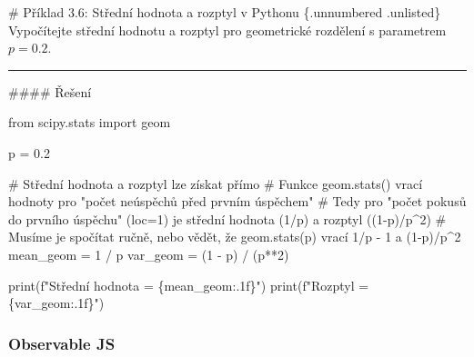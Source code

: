 \documentclass[
  czech,
  11pt,
  letterpaper,
  DIV=11,
  numbers=noendperiod]{scrreprt}
\newenvironment{Shaded}{\begin{snugshade}}{\end{snugshade}}
\newcommand{\BuiltInTok}[1]{\textcolor[rgb]{0.00,0.23,0.31}{#1}}
\newcommand{\CommentTok}[1]{\textcolor[rgb]{0.37,0.37,0.37}{#1}}
\newcommand{\DecValTok}[1]{\textcolor[rgb]{0.68,0.00,0.00}{#1}}
\newcommand{\FloatTok}[1]{\textcolor[rgb]{0.68,0.00,0.00}{#1}}
\newcommand{\ImportTok}[1]{\textcolor[rgb]{0.00,0.46,0.62}{#1}}
\newcommand{\NormalTok}[1]{\textcolor[rgb]{0.00,0.23,0.31}{#1}}
\newcommand{\OperatorTok}[1]{\textcolor[rgb]{0.37,0.37,0.37}{#1}}
\newcommand{\SpecialCharTok}[1]{\textcolor[rgb]{0.37,0.37,0.37}{#1}}
\newcommand{\SpecialStringTok}[1]{\textcolor[rgb]{0.13,0.47,0.30}{#1}}
\begin{document}
\begin{tcolorbox}[enhanced jigsaw, arc=.35mm, bottomrule=.15mm, bottomtitle=1mm, breakable, colback=white, colbacktitle=quarto-callout-note-color!10!white, colframe=quarto-callout-note-color-frame, coltitle=black, left=2mm, leftrule=.75mm, opacityback=0, opacitybacktitle=0.6, rightrule=.15mm, title=\textcolor{quarto-callout-note-color}{\faInfo}\hspace{0.5em}{Poznámka}, titlerule=0mm, toprule=.15mm, toptitle=1mm]

\# Příklad 3.6: Střední hodnota a rozptyl v Pythonu \{.unnumbered
.unlisted\} Vypočítejte střední hodnotu a rozptyl pro geometrické
rozdělení s parametrem \(p=0.2\).

\begin{center}\rule{0.5\linewidth}{0.5pt}\end{center}

\#\#\#\# Řešení

\begin{Shaded}
\begin{Highlighting}[]
\ImportTok{from}\NormalTok{ scipy.stats }\ImportTok{import}\NormalTok{ geom}

\NormalTok{p }\OperatorTok{=} \FloatTok{0.2}

\CommentTok{\# Střední hodnota a rozptyl lze získat přímo}
\CommentTok{\# Funkce geom.stats() vrací hodnoty pro "počet neúspěchů před prvním úspěchem"}
\CommentTok{\# Tedy pro "počet pokusů do prvního úspěchu" (loc=1) je střední hodnota (1/p) a rozptyl ((1{-}p)/p\^{}2)}
\CommentTok{\# Musíme je spočítat ručně, nebo vědět, že geom.stats(p) vrací 1/p {-} 1 a (1{-}p)/p\^{}2}
\NormalTok{mean\_geom }\OperatorTok{=} \DecValTok{1} \OperatorTok{/}\NormalTok{ p}
\NormalTok{var\_geom }\OperatorTok{=}\NormalTok{ (}\DecValTok{1} \OperatorTok{{-}}\NormalTok{ p) }\OperatorTok{/}\NormalTok{ (p}\OperatorTok{**}\DecValTok{2}\NormalTok{)}

\BuiltInTok{print}\NormalTok{(}\SpecialStringTok{f"Střední hodnota = }\SpecialCharTok{\{}\NormalTok{mean\_geom}\SpecialCharTok{:.1f\}}\SpecialStringTok{"}\NormalTok{)}
\BuiltInTok{print}\NormalTok{(}\SpecialStringTok{f"Rozptyl = }\SpecialCharTok{\{}\NormalTok{var\_geom}\SpecialCharTok{:.1f\}}\SpecialStringTok{"}\NormalTok{)}
\end{Highlighting}
\end{Shaded}

\end{tcolorbox}

\subsubsection*{Observable JS}\label{observable-js-2}
\end{document}
